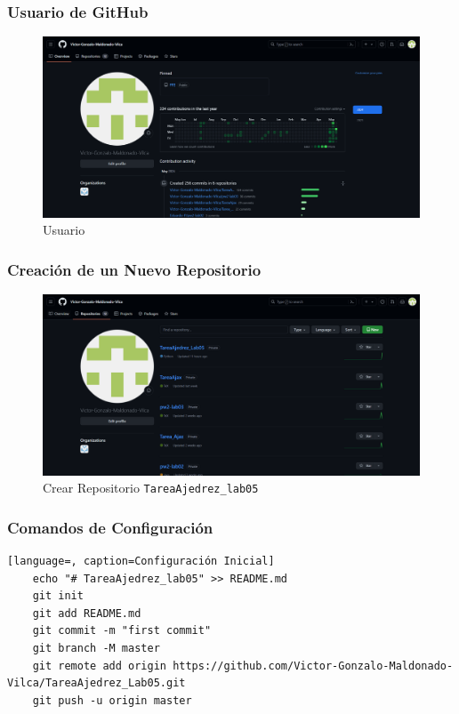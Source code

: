 \documentclass{article}
\begin{document}

	\subsubsection{Usuario de GitHub}
  \begin{figure}[H]
    \centering
    \includegraphics[width=1\textwidth, keepaspectratio]{img/usuario.png}
    \caption{Usuario}
  \end{figure}
  

  \subsubsection{Creación de un Nuevo Repositorio}
  \begin{figure}[H]
    \centering
    \includegraphics[width=1\textwidth, keepaspectratio]{img/creacion.png}
    \caption{Crear Repositorio \protect\texttt{TareaAjedrez\_lab05}}
  \end{figure}
  \newpage
  
	
  \subsubsection{Comandos de Configuración}
  \begin{lstlisting}[language=, caption=Configuración Inicial]
    echo "# TareaAjedrez_lab05" >> README.md
    git init
    git add README.md
    git commit -m "first commit"
    git branch -M master
    git remote add origin https://github.com/Victor-Gonzalo-Maldonado-Vilca/TareaAjedrez_Lab05.git
    git push -u origin master
  \end{lstlisting}
  
\end{document}

